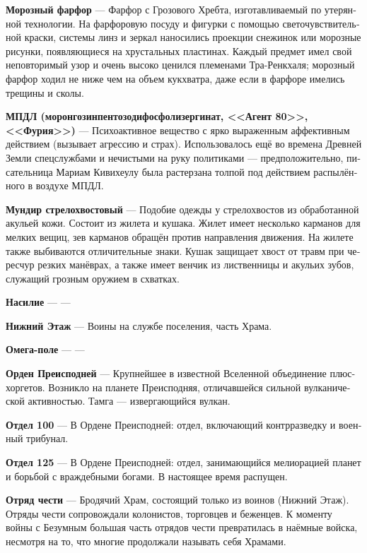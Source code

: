 \documentclass[a4paper,12pt,fleqn]{book}\usepackage{polyglossia}\setdefaultlanguage[babelshorthands=true]{russian}\setotherlanguage{english}\defaultfontfeatures{Ligatures=TeX,Mapping=tex-text}\usepackage{xcolor}\newcommand{\ml}[3]{#2}
\newcommand{\theterm}[3]{\textbf{\hypertarget{#1}{#2}} --- #3}
\begin{document}
{\theterm{frost-porcelain}
{Морозный фарфор}
{Фарфор с Грозового Хребта, изготавливаемый по утерянной технологии.
На фарфоровую посуду и фигурки с помощью светочувствительной краски, системы линз и зеркал наносились проекции снежинок или морозные рисунки, появляющиеся на хрустальных пластинах.
Каждый предмет имел свой неповторимый узор и очень высоко ценился племенами Тра-Ренкхаля;
морозный фарфор ходил не ниже чем на объем кукхватра, даже если в фарфоре имелись трещины и сколы.}

\theterm{mpdl}
{МПДЛ (моронгозинпентозодифосфолизергинат, <<Агент 80>>, <<Фурия>>)}
{Психоактивное вещество с ярко выраженным аффективным действием (вызывает агрессию и страх).
Использовалось ещё во времена Древней Земли спецслужбами и нечистыми на руку политиками --- предположительно, писательница Мариам Кивихеулу была растерзана толпой под действием распылённого в воздухе МПДЛ.}

\theterm{arrowtail-dress} %
{Мундир стрелохвостовый}
{Подобие одежды у стрелохвостов из обработанной акульей кожи.
Состоит из жилета и кушака.
Жилет имеет несколько карманов для мелких вещиц, зев карманов обращён против направления движения.
На жилете также выбиваются отличительные знаки.
Кушак защищает хвост от травм при чересчур резких манёврах, а также имеет венчик из лиственницы и акульих зубов, служащий грозным оружием в схватках.}

\theterm{violation} %
{Насилие}
{---}

\theterm{downstairs} %
{Нижний Этаж}
{Воины на службе поселения, часть Храма.}

\theterm{omega-field}
{Омега-поле}
{---}

\theterm
{order-of-netherworld}
{Орден Преисподней} %
{Крупнейшее в известной Вселенной объединение плюс-хоргетов.
Возникло на планете Преисподняя, отличавшейся сильной вулканической активностью.
Тамга --- извергающийся вулкан.}

\theterm{unit-100}
{Отдел 100}
{В Ордене Преисподней: отдел, включающий контрразведку и военный трибунал.}

\theterm{unit-125}
{Отдел 125}
{В Ордене Преисподней: отдел, занимающийся мелиорацией планет и борьбой с враждебными богами.
В настоящее время распущен.}

\theterm{squad-of-honor}
{Отряд чести}
{Бродячий Храм, состоящий только из воинов (Нижний Этаж).
Отряды чести сопровождали колонистов, торговцев и беженцев.
К моменту войны с Безумным большая часть отрядов чести превратилась в наёмные войска, несмотря на то, что многие продолжали называть себя Храмами.}

}
\end{document}
